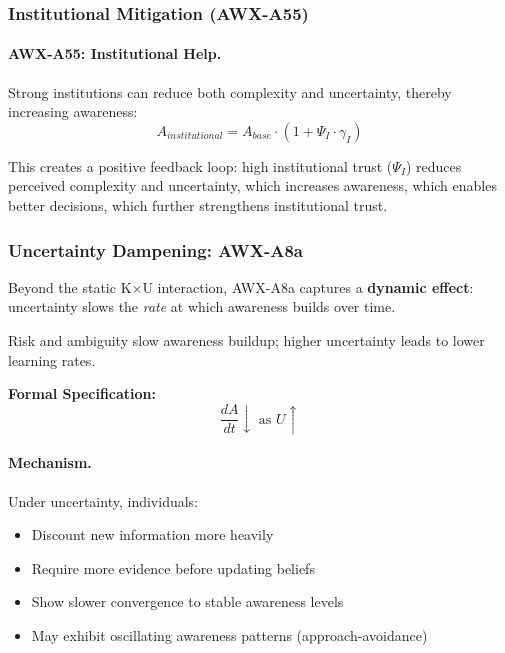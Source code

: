 \subsubsection{Institutional Mitigation (AWX-A55)}

\paragraph{AWX-A55: Institutional Help.}
Strong institutions can reduce both complexity and uncertainty, thereby 
increasing awareness:
\begin{equation}
A_{institutional} = A_{base} \cdot (1 + \Psi_I \cdot \gamma_I)
\end{equation}

This creates a positive feedback loop: high institutional trust ($\Psi_I$) 
reduces perceived complexity and uncertainty, which increases awareness, 
which enables better decisions, which further strengthens institutional trust.


\subsubsection{Uncertainty Dampening: AWX-A8a}

Beyond the static K×U interaction, AWX-A8a captures a \textbf{dynamic effect}:
uncertainty slows the \emph{rate} at which awareness builds over time.

\begin{axiom}
Risk and ambiguity slow awareness buildup; higher uncertainty leads to lower 
learning rates.

\textbf{Formal Specification:}
\begin{equation}
\frac{dA}{dt} \downarrow \text{ as } U \uparrow
\end{equation}
\end{axiom}

\paragraph{Mechanism.}
Under uncertainty, individuals:
\begin{itemize}
    \item Discount new information more heavily
    \item Require more evidence before updating beliefs
    \item Show slower convergence to stable awareness levels
    \item May exhibit oscillating awareness patterns (approach-avoidance)
\end{itemize}

